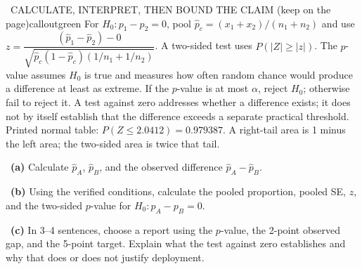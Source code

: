 \documentclass[11pt]{article}
\begin{document}
\begin{callout}{\IconBook\ CALCULATE, INTERPRET, THEN BOUND THE CLAIM (keep on the page)}{calloutgreen}
For $H_0:p_1-p_2=0$, pool $\hat p_c=(x_1+x_2)/(n_1+n_2)$ and use
$z=\dfrac{(\hat p_1-\hat p_2)-0}{\sqrt{\hat p_c(1-\hat p_c)(1/n_1+1/n_2)}}$.
A two-sided test uses $P(|Z|\ge |z|)$. The $p$-value assumes $H_0$ is true and measures
how often random chance would produce a difference at least as extreme. If the $p$-value is at most $\alpha$, reject
$H_0$; otherwise fail to reject it. A test against zero addresses whether a difference exists;
it does not by itself establish that the difference exceeds a separate practical threshold.
Printed normal table: $P(Z\leq2.0412)=0.979387$. A right-tail area is 1 minus the left area; the two-sided area is twice that tail.
\end{callout}

~\textbf{(a)} Calculate $\hat p_A$, $\hat p_B$, and the observed difference $\hat p_A-\hat p_B$.\par
{}

~\textbf{(b)} Using the verified conditions, calculate the pooled proportion, pooled SE, $z$, and the two-sided $p$-value for $H_0:p_A-p_B=0$.\par
{}

~\textbf{(c)} In 3--4 sentences, choose a report using the $p$-value, the 2-point observed gap, and the 5-point target. Explain what the test against zero establishes and why that does or does not justify deployment.\par
{}
\end{document}
